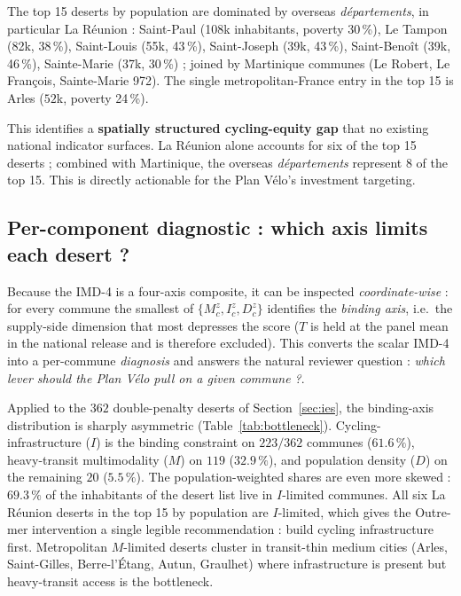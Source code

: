 \documentclass[11pt,a4paper]{article}
\begin{document}
The top 15 deserts by population are dominated by overseas
\emph{d\'epartements}, in particular La R\'eunion : Saint-Paul
(108k inhabitants, poverty 30\,\%), Le Tampon (82k, 38\,\%),
Saint-Louis (55k, 43\,\%), Saint-Joseph (39k, 43\,\%),
Saint-Beno\^it (39k, 46\,\%), Sainte-Marie (37k, 30\,\%) ;
joined by Martinique communes (Le Robert, Le Fran\c{c}ois,
Sainte-Marie 972).  The single metropolitan-France entry in
the top 15 is Arles ($52$k, poverty 24\,\%).

This identifies a \textbf{spatially structured cycling-equity
gap} that no existing national indicator surfaces.  La R\'eunion
alone accounts for six of the top 15 deserts ; combined with
Martinique, the overseas \emph{d\'epartements} represent 8 of
the top 15.  This is directly actionable for the Plan V\'elo's
investment targeting.

\subsection{Per-component diagnostic : which axis limits each desert ?}
\label{sec:bottleneck}

Because the IMD-4 is a four-axis composite, it can be inspected
\emph{coordinate-wise} : for every commune the smallest of
$\{M^{z}_c, I^{z}_c, D^{z}_c\}$ identifies the \emph{binding axis},
i.e.\ the supply-side dimension that most depresses the score
($T$ is held at the panel mean in the national release and is
therefore excluded).  This converts the scalar IMD-4 into a
per-commune \emph{diagnosis} and answers the natural reviewer
question : \emph{which lever should the Plan V\'elo pull on a
given commune ?}.

Applied to the $362$ double-penalty deserts of
Section~\ref{sec:ies}, the binding-axis distribution is sharply
asymmetric (Table~\ref{tab:bottleneck}).  Cycling-infrastructure
($I$) is the binding constraint on $223/362$ communes
($61.6\,\%$), heavy-transit multimodality ($M$) on $119$
($32.9\,\%$), and population density ($D$) on the remaining $20$
($5.5\,\%$).  The population-weighted shares are even more
skewed : $69.3\,\%$ of the inhabitants of the desert list live in
$I$-limited communes.  All six La R\'eunion deserts in the top 15
by population are $I$-limited, which gives the Outre-mer
intervention a single legible recommendation : build cycling
infrastructure first.  Metropolitan $M$-limited deserts cluster
in transit-thin medium cities (Arles, Saint-Gilles, Berre-l'\'Etang,
Autun, Graulhet) where infrastructure is present but heavy-transit
access is the bottleneck.
\end{document}
